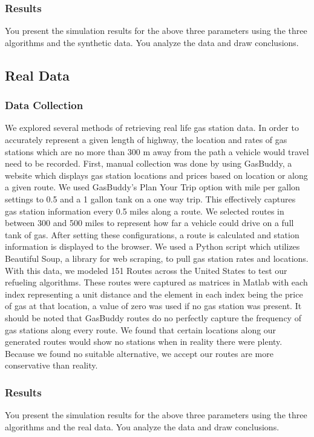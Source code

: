 \documentclass[conference]{IEEEtran}
\theoremstyle{definition}
\begin{document}
\subsubsection{Results}
You present the simulation results for the above three parameters using the three algorithms and the synthetic data. You analyze the data and draw conclusions. 


\subsection{Real Data}

\subsubsection{Data Collection}
We explored several methods of retrieving real life gas station data. In order to accurately represent a given length of highway, the location and rates of gas stations which are no more than 300 m away from the path a vehicle would travel need to be recorded. First, manual collection was done by using GasBuddy, a website which displays gas station locations and prices based on location or along a given route. We used GasBuddy’s Plan Your Trip option with mile per gallon settings to 0.5 and a 1 gallon tank on a one way trip. This effectively captures gas station information every 0.5 miles along a route. We selected routes in between 300 and 500 miles to represent how far a vehicle could drive on a full tank of gas. After setting these configurations, a route is calculated and station information is displayed to the browser. We used a Python script which utilizes Beautiful Soup, a library for web scraping, to pull gas station rates and locations. With this data, we modeled 151 Routes across the United States to test our refueling algorithms. These routes were captured as matrices in Matlab with each index representing a unit distance and the element in each index being the price of gas at that location, a value of zero was used if no gas station was present. It should be noted that GasBuddy routes do no perfectly capture the frequency of gas stations along every route. We found that certain locations along our generated routes would show no stations when in reality there were plenty. Because we found no suitable alternative, we accept our routes are more conservative than reality.


\subsubsection{Results}
{\color{red} You present the simulation results for the above three parameters using the three algorithms and the real data. You analyze the data and draw conclusions.}
\end{document}
